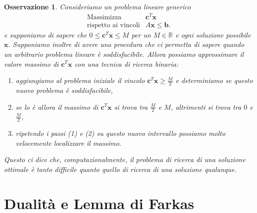 \documentclass[italian, letter paper, 12pt, reqno]{article}
\theoremstyle{myteo}
\newtheorem{remark}[theorem]{Osservazione}
\numberwithin{equation}{section}
\begin{document}
\begin{remark}
  \label{oss:binary_search}
  Consideriamo un problema lineare generico
  \begin{equation*}
    \begin{array}{ll}
      \text{Massimizza} & \mathbf{c}^T\mathbf{x}\\
      \text{rispetto ai vincoli} & A\mathbf{x}\leq\mathbf{b}.
    \end{array}
  \end{equation*}
  e supponiamo di sapere che \(0\leq \mathbf{c}^T\mathbf{x}\leq M\) per un \(M\in\mathbb{R}\) e ogni soluzione possibile \(\mathbf{x}\).
  Supponiamo inoltre di avere una procedura che ci permetta di sapere quando un arbitrario problema lineare è soddisfacibile.
  Allora possiamo approssimare il valore massimo di \(\mathbf{c}^T\mathbf{x}\) con una tecnica di ricerca binaria:
  \begin{enumerate}
  \item aggiungiamo al problema iniziale il vincolo \(\mathbf{c}^T\mathbf{x}\geq \frac{M}{2}\) e determiniamo se questo nuovo problema è soddisfacibile,
  \item se lo è allora il massimo di \(\mathbf{c}^T\mathbf{x}\) si trova tra \(\frac{M}{2}\) e \(M\), altrimenti si trova tra \(0\) e \(\frac{M}{2}\),
  \item ripetendo i passi (1) e (2) su questo nuovo intervallo possiamo molto velocemente localizzare il massimo.
  \end{enumerate}
  Questo ci dice che, computazionalmente, il problema di ricerca di una soluzione ottimale è tanto difficile quanto quello di ricerca di una soluzione qualunque.
\end{remark}

\section{Dualità e Lemma di Farkas}
\label{sec:dualità_e_lemma_di_farkas}
\end{document}
